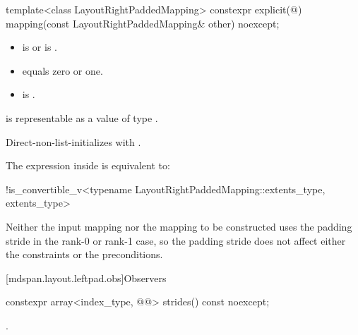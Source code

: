 %
\begin{itemdecl}
template<class LayoutRightPaddedMapping>
  constexpr explicit(@\seebelow@)
    mapping(const LayoutRightPaddedMapping& other) noexcept;
\end{itemdecl}

\begin{itemdescr}
\pnum
\constraints
\begin{itemize}
\item
{}
is  or\newline
{}
is .
\item
{} equals zero or one.
\item
{}
is .
\end{itemize}

\pnum
\expects
{} is representable as
a value of type .

\pnum
\effects
Direct-non-list-initializes  with .

\pnum
\remarks
The expression inside  is equivalent to:
\begin{codeblock}
!is_convertible_v<typename LayoutRightPaddedMapping::extents_type, extents_type>
\end{codeblock}

\begin{note}
Neither the input mapping nor the mapping to be constructed
uses the padding stride in the rank-0 or rank-1 case,
so the padding stride does not affect
either the constraints or the preconditions.
\end{note}
\end{itemdescr}

[mdspan.layout.leftpad.obs]{Observers}

%
\begin{itemdecl}
constexpr array<index_type, @@> strides() const noexcept;
\end{itemdecl}

\begin{itemdescr}
\pnum
\returns
{}.
\end{itemdescr}

